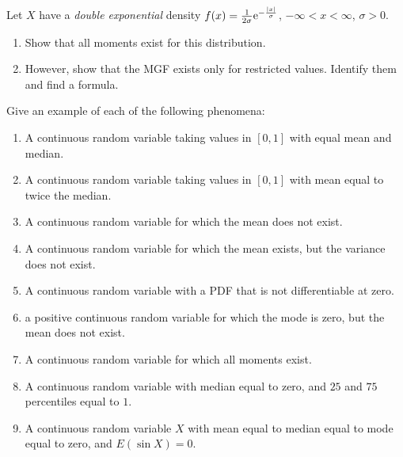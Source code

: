 \begin{problem}[Handout 13, \# 7]
  Let \(X\) have a \emph{double exponential} density
  \(f(x)=\frac{1}{2\sigma}\mathrm{e}^{-\frac{|x|}{\sigma}}\),
  \(-\infty<x<\infty\), \(\sigma>0\).
  \begin{enumerate}[label=(\alph*),noitemsep]
  \item Show that all moments exist for this distribution.
  \item However, show that the MGF exists only for restricted
    values. Identify them and find a formula.
  \end{enumerate}
\end{problem}
\begin{solution*}

\end{solution*}

\begin{problem}[Handout 13, \# 16]
  Give an example of each of the following phenomena:
  \begin{enumerate}[label=(\alph*),noitemsep]
  \item A continuous random variable taking values in \([0,1]\) with equal
    mean and median.
  \item A continuous random variable taking values in \([0,1]\) with mean
    equal to twice the median.
  \item A continuous random variable for which the mean does not exist.
  \item A continuous random variable for which the mean exists, but the
    variance does not exist.
  \item A continuous random variable with a PDF that is not differentiable
    at zero.
  \item a positive continuous random variable for which the mode is zero,
    but the mean does not exist.
  \item A continuous random variable for which all moments exist.
  \item A continuous random variable with median equal to zero, and
    \(25\) and \(75\) percentiles equal to \(1\).
  \item A continuous random variable \(X\) with mean equal to median equal
    to mode equal to zero, and \(E(\sin X)=0\).
  \end{enumerate}
\end{problem}
\begin{solution*}

\end{solution*}

